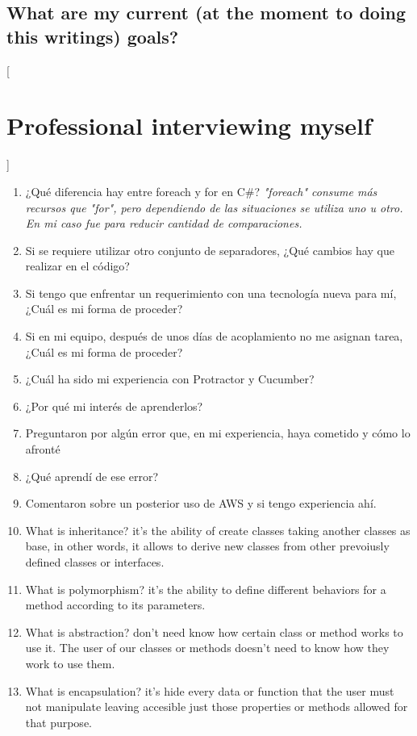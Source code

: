 \subsection{What are my current (at the moment to doing this writings) goals?}

[\section{Professional interviewing myself}]
\begin{multicols}{2}
\begin{enumerate}
\item ¿Qué diferencia hay entre foreach y for en C\#? \emph{"foreach" consume más recursos que "for", pero dependiendo de las situaciones se utiliza uno u otro. En mi caso fue para reducir cantidad de comparaciones.}
\item Si se requiere utilizar otro conjunto de separadores, ¿Qué cambios hay que realizar en el código?
\item Si tengo que enfrentar un requerimiento con una tecnología nueva para mí, ¿Cuál es mi forma de proceder?
\item Si en mi equipo, después de unos días de acoplamiento no me asignan tarea, ¿Cuál es mi forma de proceder?
\item ¿Cuál ha sido mi experiencia con Protractor y Cucumber?
\item ¿Por qué mi interés de aprenderlos?
\item Preguntaron por algún error que, en mi experiencia, haya cometido y cómo lo afronté
\item ¿Qué aprendí de ese error?
\item Comentaron sobre un posterior uso de AWS y si tengo experiencia ahí.
\item What is inheritance? it's the ability of create classes taking another classes as base, in other words, it allows to derive new classes from other prevoiusly defined classes or interfaces.
\item What is polymorphism? it's the ability to define different behaviors for a method according to its parameters. 
\item What is abstraction? don't need know how certain class or method works to use it. The user of our classes or methods doesn't need to know how they work to use them.
\item What is encapsulation? it's hide every data or function that the user must not manipulate leaving accesible just those properties or methods allowed for that purpose.

\end{enumerate}
\end{multicols}
